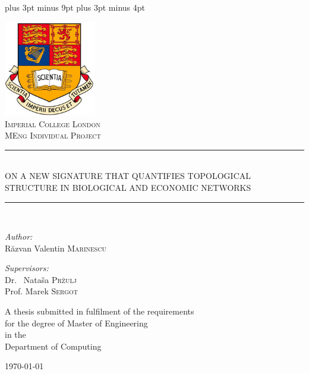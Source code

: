 \documentclass[11pt,a4paper,oneside]{book}
\newcommand{\HRule}{\rule{\linewidth}{0.5mm}}
\theoremstyle{definition}
\theoremstyle{definition}
\theoremstyle{definition}
\newcommand{\FrontPageStyle}{\pagestyle{empty}}
\begin{document}
\belowdisplayskip=12pt plus 3pt minus 9pt
\belowdisplayshortskip=7pt plus 3pt minus 4pt

\FrontPageStyle{}

\begin{titlepage}
\begin{center}

\includegraphics[width=0.3\textwidth]{./images/imperial_logo}~\\[1cm]

\textsc{\LARGE Imperial College London}\\[1.5cm]

\textsc{\Large MEng Individual Project}\\[0.5cm]

\HRule \\[0.4cm]
{ \Large ON A NEW SIGNATURE THAT QUANTIFIES TOPOLOGICAL STRUCTURE IN BIOLOGICAL AND ECONOMIC NETWORKS \\[0.4cm] }

\HRule \\[1.5cm]

\begin{minipage}{0.4\textwidth}
\begin{flushleft} \large
\emph{Author:}\\
R\u{a}zvan Valentin \textsc{Marinescu}
\end{flushleft}
\end{minipage}
\begin{minipage}{0.4\textwidth}
\begin{flushright} \large
\emph{Supervisors:} \\
Dr. ~Nata\v{s}a \textsc{Pr\v{z}ulj}\\
Prof. Marek \textsc{Sergot}
\end{flushright}
\end{minipage}

\vfill

A thesis submitted in fulfilment of the requirements\\ for the degree of Master of Engineering\\ in the\\ Department of Computing

\vfill

{\large \today}

\end{center}
\end{titlepage}
\end{document}
